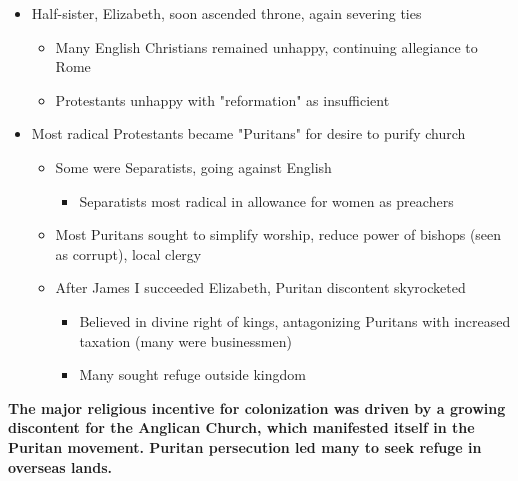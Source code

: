 \documentclass[a4paper]{article}
\begin{document}
{\begin{itemize}
\begin{itemize}
\begin{itemize}
                    \item Executed Protestants ("Bloody Mary")
                \end{itemize}
                \item Half-sister, Elizabeth, soon ascended throne, again severing ties
                \begin{itemize}
                    \item Many English Christians remained unhappy, continuing allegiance to Rome
                    \item Protestants unhappy with "reformation" as insufficient
                \end{itemize}
                \item Most radical Protestants became "Puritans" for desire to purify church
                \begin{itemize}
                    \item Some were Separatists, going against English 
                    \begin{itemize}
                        \item Separatists most radical in allowance for women as preachers
                    \end{itemize}
                    \item Most Puritans sought to simplify worship, reduce power of bishops (seen as corrupt), local clergy
                    \item After James I succeeded Elizabeth, Puritan discontent skyrocketed
                    \begin{itemize}
                        \item Believed in divine right of kings, antagonizing Puritans with increased taxation (many were businessmen)
                        \item Many sought refuge outside kingdom
                    \end{itemize}
                \end{itemize}
            \end{itemize}
        \end{itemize}
        \textbf{The major religious incentive for colonization was driven by a growing discontent for the Anglican Church, which manifested itself in the Puritan movement. Puritan persecution led many to seek refuge in overseas lands.}}
\end{document}
